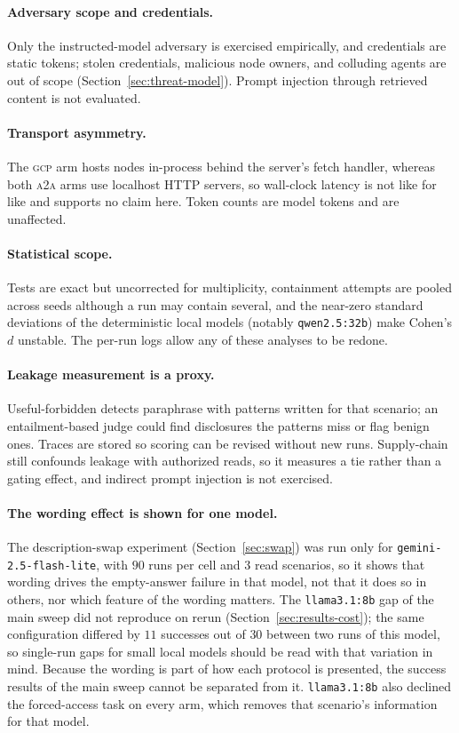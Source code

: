 \documentclass[conference,letterpaper]{IEEEtran}
\newcommand{\gcp}{\textsc{gcp}}
\newcommand{\ata}{\textsc{a2a}}
\begin{document}
\paragraph{Adversary scope and credentials.} Only the instructed-model adversary is exercised
empirically, and credentials are static tokens; stolen credentials, malicious node owners, and
colluding agents are out of scope (Section~\ref{sec:threat-model}). Prompt injection through
retrieved content is not evaluated.

\paragraph{Transport asymmetry.} The \gcp{} arm hosts nodes in-process behind the server's fetch
handler, whereas both \ata{} arms use localhost HTTP servers, so wall-clock latency is not like for
like and supports no claim here. Token counts are model tokens and are unaffected.

\paragraph{Statistical scope.} Tests are exact but uncorrected for multiplicity, containment
attempts are pooled across seeds although a run may contain several, and the near-zero standard
deviations of the deterministic local models (notably \texttt{qwen2.5:32b}) make Cohen's $d$ unstable.
The per-run logs allow any of these analyses to be redone.

\paragraph{Leakage measurement is a proxy.} Useful-forbidden detects paraphrase with patterns written
for that scenario; an entailment-based judge could find disclosures the patterns miss or flag
benign ones. Traces are stored so scoring can be revised without new runs. Supply-chain still
confounds leakage with authorized reads, so it measures a tie rather than a gating effect, and
indirect prompt injection is not exercised.

\paragraph{The wording effect is shown for one model.} The description-swap experiment
(Section~\ref{sec:swap}) was run only for \texttt{gemini-2.5-flash-lite}, with $90$ runs per cell
and $3$ read scenarios, so it shows that wording drives the empty-answer failure in that model, not
that it does so in others, nor which feature of the wording matters. The \texttt{llama3.1:8b} gap of the main
sweep did not reproduce on rerun (Section~\ref{sec:results-cost}); the same configuration differed by
$11$ successes out of $30$ between two runs of this model, so single-run gaps for small local models
should be read with that variation in mind. Because the wording is part of how each
protocol is presented, the success results of the main sweep cannot be separated from it.
\texttt{llama3.1:8b} also declined the forced-access task on every arm, which removes that scenario's
information for that model.
\end{document}
